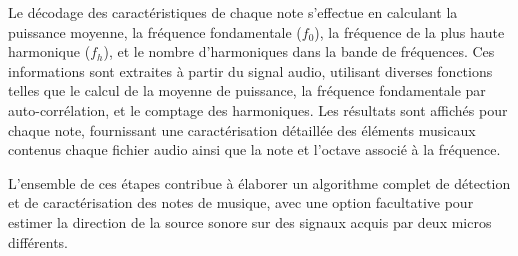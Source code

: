Le décodage des caractéristiques de chaque note s'effectue en calculant la puissance moyenne, la fréquence fondamentale ($f_0$), la fréquence de la plus haute harmonique ($f_h$), et le nombre d'harmoniques dans la bande de fréquences. Ces informations sont extraites à partir du signal audio, utilisant diverses fonctions telles que le calcul de la moyenne de puissance, la fréquence fondamentale par auto-corrélation, et le comptage des harmoniques. Les résultats sont affichés pour chaque note, fournissant une caractérisation détaillée des éléments musicaux contenus chaque fichier audio ainsi que la note et l'octave associé à la fréquence. 

L'ensemble de ces étapes contribue à élaborer un algorithme complet de détection et de caractérisation des notes de musique, avec une option facultative pour estimer la direction de la source sonore sur des signaux acquis par deux micros différents. 